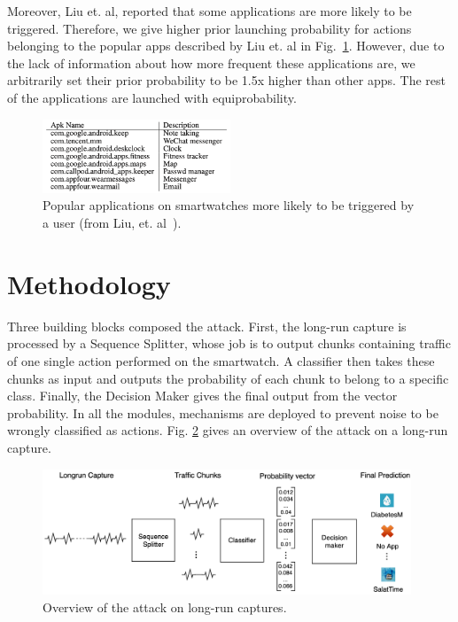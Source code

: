 Moreover, Liu et. al, reported that some applications are more likely to be triggered. Therefore, we give higher prior launching probability for actions belonging to the popular apps described by Liu et. al in Fig.~\ref{fig:popular apps}. However, due to the lack of information about how more frequent these applications are, we arbitrarily set their prior probability to be 1.5x higher than other apps. The rest of the applications are launched with equiprobability.


\begin{figure}[H]
 \centering
 \includegraphics[width=0.5\textwidth]{figures/popular apps.png}
 \caption{Popular applications on smartwatches more likely to be triggered by a user (from Liu, et.  al~\cite{10.1145/3081333.3081351}).}
 \label{fig:popular apps}
\end{figure}


\section{Methodology}
\label{sec:longrun methodology}
Three building blocks composed the attack. First, the long-run capture is processed by a Sequence Splitter, whose job is to output chunks containing traffic of one single action performed on the smartwatch. A classifier then takes these chunks as input and outputs the probability of each chunk to belong to a specific class. Finally, the Decision Maker gives the final output from the vector probability. In all the modules, mechanisms are deployed to prevent noise to be wrongly classified as actions. Fig. \ref{fig:longrun methodology} gives an overview of the attack on a long-run capture.


\begin{figure}[H]
 \centering
 \includegraphics[width=0.98\textwidth]{figures/longrun overview 2.png}
 \caption{Overview of the attack on long-run captures.}
 \label{fig:longrun methodology}
\end{figure}

